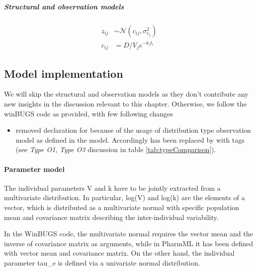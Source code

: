 \subparagraph{Structural and observation models}
\begin{align*}
	z_{ij} &\sim \mathcal N(c_{ij},\sigma_{e_j}^2) \\
	c_{ij} &= D/V_j e^{-k_j t_i}
\end{align*}

\subsection{Model implementation}
We will skip the structural and observation models as they don't contribute
any new insights in the discussion relevant to this chapter. Otherwise, we follow 
the winBUGS code as provided, with few following changes 
\begin{itemize}
\item 
removed  declaration for  because of the 
usage of distribution type observation model as defined in the model. 
Accordingly  has been replaced by  with 
 tags (see \textit{Type O1}, \textit{Type O3} discussion 
in table \ref{tab:typeComparison}).
\end{itemize}


\paragraph{Parameter model} 
The individual parameters V and k have to be jointly extracted from a 
multivariate distribution. In particular, log(V) and log(k) are the elements 
of a vector, which is distributed as a multivariate normal with specific 
population mean and covariance matrix describing the inter-individual variability.

In the WinBUGS code, the multivariate normal requires the vector mean 
and the inverse of covariance matrix as arguments, while in PharmML it has 
been defined with vector mean and covariance matrix.
On the other hand, the individual parameter tau\_e is defined via a univariate 
normal distribution.

